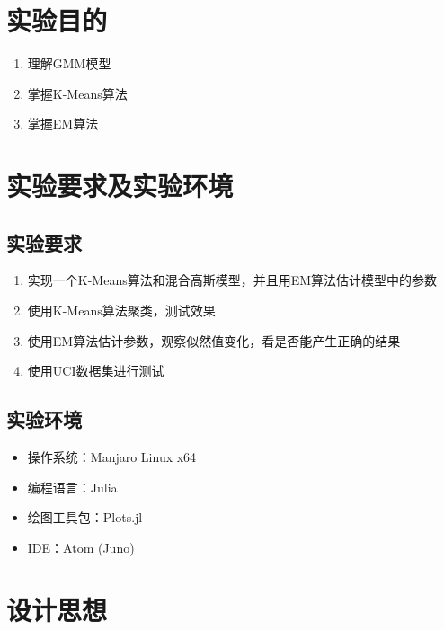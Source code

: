 \documentclass{ML}
\begin{document}
\maketitle

\tableofcontents
\newpage

\section{实验目的}

\begin{enumerate}
	\item 理解GMM模型
	\item 掌握K-Means算法
	\item 掌握EM算法
\end{enumerate}

\section{实验要求及实验环境}

\subsection{实验要求}

\begin{enumerate}
	\item 实现一个K-Means算法和混合高斯模型，并且用EM算法估计模型中的参数
	\item 使用K-Means算法聚类，测试效果
	\item 使用EM算法估计参数，观察似然值变化，看是否能产生正确的结果
	\item 使用UCI数据集进行测试
\end{enumerate}

\subsection{实验环境}

\begin{itemize}
	\item 操作系统：Manjaro Linux x64
	\item 编程语言：Julia
	\item 绘图工具包：Plots.jl
	\item IDE：Atom (Juno)
\end{itemize}

\section{设计思想}
\end{document}
